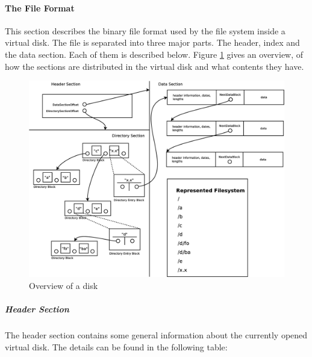 \paragraph{The File Format}\label{sec:file_format}
This section describes the binary file format used by the file system inside a
virtual disk. The file is separated into three major parts. The header, index
and the data section. Each of them is described below. Figure
\ref{fig:disk_overview} gives an overview, of how the sections are distributed
in the virtual disk and what contents they have.

\begin{figure}[h!]
\centering
\includegraphics[width=1\textwidth]{figures/fileFormat.eps}
\caption{Overview of a disk}
\label{fig:disk_overview}
\end{figure}

\subparagraph{Header Section} The header section contains some general information
about the currently opened virtual disk. The details can be found in the
following table:

